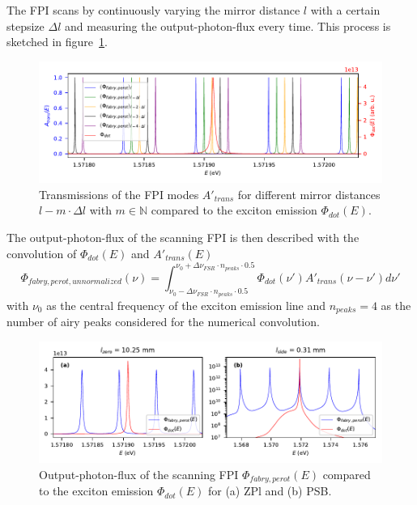 The \ac{FPI} scans by continuously varying the mirror distance $l$ with a certain stepsize $\Delta l$ and measuring the output-photon-flux every time.
This process is sketched in figure~\ref{fig:simulation-comparison-dot-fabry-perot-sweep}.

\begin{figure}[H]
	\centering
	\includegraphics[width=\linewidth]{figures/fabry-perot/plots/simulation-comparison-dot-fabry-perot-sweep}
	\caption{Transmissions of the FPI modes $A'_{trans}$ for different mirror distances $l - m \cdot \Delta l$ with $m \in \mathbb{N}$ compared to the exciton emission $\Phi_{dot}(E)$.}
	\label{fig:simulation-comparison-dot-fabry-perot-sweep}
\end{figure}


The output-photon-flux of the scanning \ac{FPI} is then described with the convolution of $\Phi_{dot}(E)$ and $A'_{trans}(E)$
\begin{equation}
\Phi_{fabry,perot, unnormalized}(\nu) = \int^{\nu_0 + \Delta \nu_{FSR} \cdot n_{peaks} \cdot 0.5}_{\nu_0 - \Delta \nu_{FSR} \cdot n_{peaks}\cdot 0.5}  \Phi_{dot}(\nu')A'_{trans}(\nu - \nu') d\nu'
\end{equation}
with $\nu_0$ as the central frequency of the exciton emission line and $n_{peaks}=4$ as the number of airy peaks considered for the numerical convolution.

\begin{figure}[H]
	\centering
	\includegraphics[width=\linewidth]{figures/fabry-perot/plots/simulation-comparison-dot-fabry-perot-output}
	\caption{Output-photon-flux of the scanning FPI $\Phi_{fabry,perot}(E)$ compared to the exciton emission $\Phi_{dot}(E)$ for (a) ZPl and (b) PSB.}
	\label{fig:simulation-comparison-dot-fabry-perot-output}
\end{figure}

